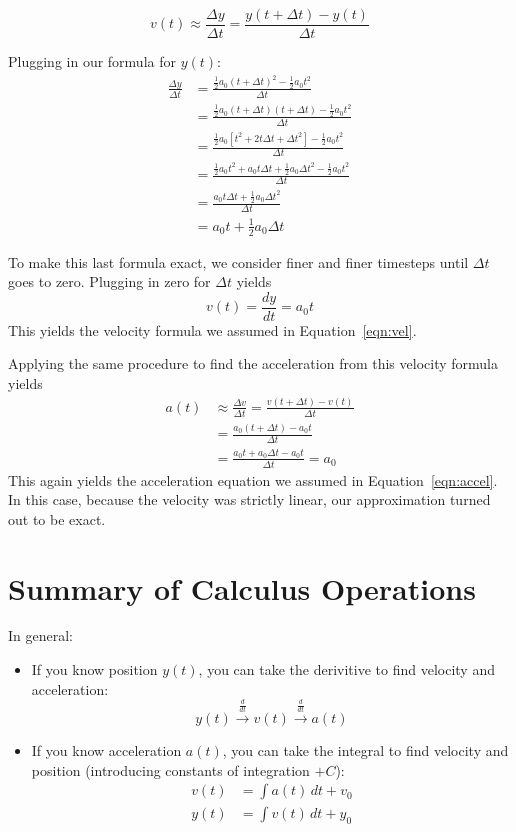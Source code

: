 \documentclass[12pt]{article}
\begin{document}
\begin{equation}
v(t) \approx \frac{\Delta y}{\Delta t} = \frac{y(t+\Delta t) - y(t)}{\Delta t}
\end{equation}

Plugging in our formula for $y(t)$:
\begin{align}
\frac{\Delta y}{\Delta t} &= \frac{\frac{1}{2}a_0(t+\Delta t)^2 - \frac{1}{2}a_0 t^2}{\Delta t} \\ \nonumber
&= \frac{\frac{1}{2}a_0(t+\Delta t)(t+\Delta t) - \frac{1}{2}a_0 t^2}{\Delta t} \\ \nonumber
&= \frac{\frac{1}{2}a_0 \left[ t^2 + 2t\Delta t + \Delta t^2 \right] - \frac{1}{2}a_0 t^2}{\Delta t} \\ \nonumber
&= \frac{\frac{1}{2}a_0 t^2 + a_0 t \Delta t + \frac{1}{2}a_0 \Delta t^2 - \frac{1}{2}a_0 t^2}{\Delta t} \\ \nonumber
&= \frac{a_0 t \Delta t + \frac{1}{2}a_0 \Delta t^2}{\Delta t} \\ \nonumber
&= a_0 t + \frac{1}{2}a_0 \Delta t
\end{align}

To make this last formula exact, we consider finer and finer timesteps until $\Delta t$ goes to zero. Plugging in zero for $\Delta t$ yields
\begin{equation}
v(t) = \frac{dy}{dt} = a_0 t
\end{equation}
This yields the velocity formula we assumed in Equation~\ref{eqn:vel}.

Applying the same procedure to find the acceleration from this velocity formula yields
\begin{align}
a(t) &\approx \frac{\Delta v}{\Delta t} = \frac{v(t+\Delta t) - v(t)}{\Delta t} \\ \nonumber
&= \frac{a_0(t+\Delta t) - a_0 t}{\Delta t} \\ \nonumber
&= \frac{a_0 t + a_0 \Delta t - a_0 t}{\Delta t} = a_0
\end{align}
This again yields the acceleration equation we assumed in Equation~\ref{eqn:accel}. In this case, because the velocity was strictly linear, our approximation turned out to be exact.

\section{Summary of Calculus Operations}
In general:
\begin{itemize}
    \item If you know position $y(t)$, you can take the derivitive to find velocity and acceleration:
    \[ y(t) \xrightarrow{\frac{d}{dt}} v(t) \xrightarrow{\frac{d}{dt}} a(t) \]
    \item If you know acceleration $a(t)$, you can take the integral to find velocity and position (introducing constants of integration $+C$):
    \begin{align}
    v(t) &= \int a(t) \, dt + v_0 \\
    y(t) &= \int v(t) \, dt + y_0
    \end{align}
\end{itemize}
\end{document}
